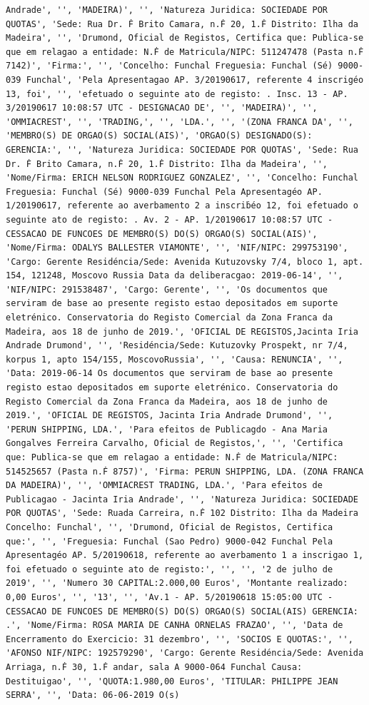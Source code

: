 \documentclass[
  12pt,
]{article}
\begin{document}
\begin{verbatim}
Andrade', '', 'MADEIRA)', '', 'Natureza Juridica: SOCIEDADE POR QUOTAS', 'Sede: Rua Dr. Ḟ Brito Camara, n.Ḟ 20, 1.Ḟ Distrito: Ilha da Madeira', '', 'Drumond, Oficial de Registos, Certifica que: Publica-se que em relagao a entidade: N.Ḟ de Matricula/NIPC: 511247478 (Pasta n.Ḟ 7142)', 'Firma:', '', 'Concelho: Funchal Freguesia: Funchal (Sé) 9000-039 Funchal', 'Pela Apresentagao AP. 3/20190617, referente 4 inscrigéo 13, foi', '', 'efetuado o seguinte ato de registo: . Insc. 13 - AP. 3/20190617 10:08:57 UTC - DESIGNACAO DE', '', 'MADEIRA)', '', 'OMMIACREST', '', 'TRADING,', '', 'LDA.', '', '(ZONA FRANCA DA', '', 'MEMBRO(S) DE ORGAO(S) SOCIAL(AIS)', 'ORGAO(S) DESIGNADO(S): GERENCIA:', '', 'Natureza Juridica: SOCIEDADE POR QUOTAS', 'Sede: Rua Dr. Ḟ Brito Camara, n.Ḟ 20, 1.Ḟ Distrito: Ilha da Madeira', '', 'Nome/Firma: ERICH NELSON RODRIGUEZ GONZALEZ', '', 'Concelho: Funchal Freguesia: Funchal (Sé) 9000-039 Funchal Pela Apresentagéo AP. 1/20190617, referente ao averbamento 2 a inscriḃéo 12, foi efetuado o seguinte ato de registo: . Av. 2 - AP. 1/20190617 10:08:57 UTC - CESSACAO DE FUNCOES DE MEMBRO(S) DO(S) ORGAO(S) SOCIAL(AIS)', 'Nome/Firma: ODALYS BALLESTER VIAMONTE', '', 'NIF/NIPC: 299753190', 'Cargo: Gerente Residéncia/Sede: Avenida Kutuzovsky 7/4, bloco 1, apt. 154, 121248, Moscovo Russia Data da deliberacgao: 2019-06-14', '', 'NIF/NIPC: 291538487', 'Cargo: Gerente', '', 'Os documentos que serviram de base ao presente registo estao depositados em suporte eletrénico. Conservatoria do Registo Comercial da Zona Franca da Madeira, aos 18 de junho de 2019.', 'OFICIAL DE REGISTOS,Jacinta Iria Andrade Drumond', '', 'Residéncia/Sede: Kutuzovky Prospekt, nr 7/4, korpus 1, apto 154/155, MoscovoRussia', '', 'Causa: RENUNCIA', '', 'Data: 2019-06-14 Os documentos que serviram de base ao presente registo estao depositados em suporte eletrénico. Conservatoria do Registo Comercial da Zona Franca da Madeira, aos 18 de junho de 2019.', 'OFICIAL DE REGISTOS, Jacinta Iria Andrade Drumond', '', 'PERUN SHIPPING, LDA.', 'Para efeitos de Publicagdo - Ana Maria Gongalves Ferreira Carvalho, Oficial de Registos,', '', 'Certifica que: Publica-se que em relagao a entidade: N.Ḟ de Matricula/NIPC: 514525657 (Pasta n.Ḟ 8757)', 'Firma: PERUN SHIPPING, LDA. (ZONA FRANCA DA MADEIRA)', '', 'OMMIACREST TRADING, LDA.', 'Para efeitos de Publicagao - Jacinta Iria Andrade', '', 'Natureza Juridica: SOCIEDADE POR QUOTAS', 'Sede: Ruada Carreira, n.Ḟ 102 Distrito: Ilha da Madeira Concelho: Funchal', '', 'Drumond, Oficial de Registos, Certifica que:', '', 'Freguesia: Funchal (Sao Pedro) 9000-042 Funchal Pela Apresentagéo AP. 5/20190618, referente ao averbamento 1 a inscrigao 1, foi efetuado o seguinte ato de registo:', '', '', '2 de julho de 2019', '', 'Numero 30 CAPITAL:2.000,00 Euros', 'Montante realizado: 0,00 Euros', '', '13', '', 'Av.1 - AP. 5/20190618 15:05:00 UTC - CESSACAO DE FUNCOES DE MEMBRO(S) DO(S) ORGAO(S) SOCIAL(AIS) GERENCIA: .', 'Nome/Firma: ROSA MARIA DE CANHA ORNELAS FRAZAO', '', 'Data de Encerramento do Exercicio: 31 dezembro', '', 'SOCIOS E QUOTAS:', '', 'AFONSO NIF/NIPC: 192579290', 'Cargo: Gerente Residéncia/Sede: Avenida Arriaga, n.Ḟ 30, 1.Ḟ andar, sala A 9000-064 Funchal Causa: Destituigao', '', 'QUOTA:1.980,00 Euros', 'TITULAR: PHILIPPE JEAN SERRA', '', 'Data: 06-06-2019 O(s) 
\end{verbatim}
\end{document}
